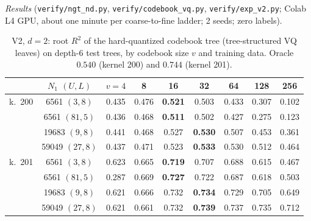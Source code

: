 \documentclass[11pt]{article}
\theoremstyle{definition}
\begin{document}
\emph{Results} (\texttt{verify/ngt\_nd.py}, \texttt{verify/codebook\_vq.py}, \texttt{verify/exp\_v2.py};
Colab L4 GPU, about one minute per coarse-to-fine ladder; 2 seeds; zero labels).

\begin{table}[h]\centering
\caption{V2, $d=2$: root $R^2$ of the hard-quantized codebook tree (tree-structured VQ leaves) on
depth-6 test trees, by codebook size $v$ and training data. Oracle $0.540$ (kernel 200) and $0.744$
(kernel 201).}\label{tab:v2}
\small\begin{tabular}{cc|ccccccc}\toprule
& $N_1$ $(U,L)$ & $v=4$ & 8 & 16 & 32 & 64 & 128 & 256\\\midrule
k.\ 200 & 6561 $(3,8)$ & 0.435 & 0.476 & \textbf{0.521} & 0.503 & 0.433 & 0.307 & 0.102\\
& 6561 $(81,5)$ & 0.436 & 0.468 & \textbf{0.511} & 0.502 & 0.427 & 0.275 & 0.123\\
& 19683 $(9,8)$ & 0.441 & 0.468 & 0.527 & \textbf{0.530} & 0.507 & 0.453 & 0.361\\
& 59049 $(27,8)$ & 0.437 & 0.471 & 0.523 & \textbf{0.533} & 0.530 & 0.512 & 0.464\\\midrule
k.\ 201 & 6561 $(3,8)$ & 0.623 & 0.665 & \textbf{0.719} & 0.707 & 0.688 & 0.615 & 0.467\\
& 6561 $(81,5)$ & 0.287 & 0.669 & \textbf{0.727} & 0.722 & 0.687 & 0.618 & 0.503\\
& 19683 $(9,8)$ & 0.621 & 0.666 & 0.732 & \textbf{0.734} & 0.729 & 0.705 & 0.649\\
& 59049 $(27,8)$ & 0.621 & 0.661 & 0.732 & \textbf{0.739} & 0.737 & 0.735 & 0.712\\
\bottomrule\end{tabular}
\end{table}
\end{document}

